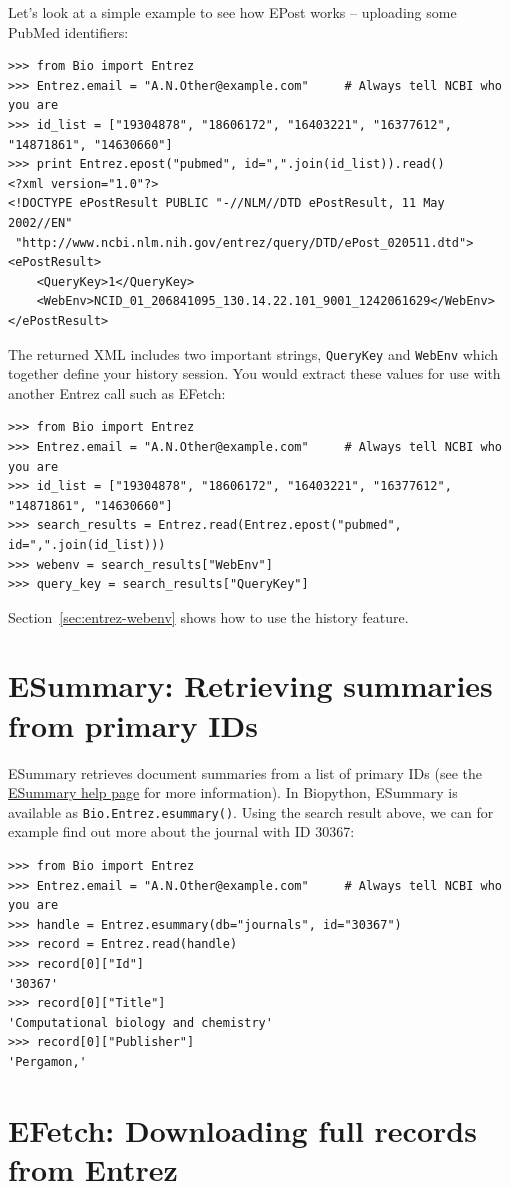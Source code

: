 \documentclass{report}
\begin{document}
Let's look at a simple example to see how EPost works -- uploading some PubMed identifiers:
\begin{verbatim}
>>> from Bio import Entrez
>>> Entrez.email = "A.N.Other@example.com"     # Always tell NCBI who you are
>>> id_list = ["19304878", "18606172", "16403221", "16377612", "14871861", "14630660"]
>>> print Entrez.epost("pubmed", id=",".join(id_list)).read()
<?xml version="1.0"?>
<!DOCTYPE ePostResult PUBLIC "-//NLM//DTD ePostResult, 11 May 2002//EN"
 "http://www.ncbi.nlm.nih.gov/entrez/query/DTD/ePost_020511.dtd">
<ePostResult>
	<QueryKey>1</QueryKey>
	<WebEnv>NCID_01_206841095_130.14.22.101_9001_1242061629</WebEnv>
</ePostResult>
\end{verbatim}
\noindent The returned XML includes two important strings, \verb|QueryKey| and \verb|WebEnv| which together define your history session.
You would extract these values for use with another Entrez call such as EFetch:
\begin{verbatim}
>>> from Bio import Entrez
>>> Entrez.email = "A.N.Other@example.com"     # Always tell NCBI who you are
>>> id_list = ["19304878", "18606172", "16403221", "16377612", "14871861", "14630660"]
>>> search_results = Entrez.read(Entrez.epost("pubmed", id=",".join(id_list)))
>>> webenv = search_results["WebEnv"]
>>> query_key = search_results["QueryKey"] 
\end{verbatim}
\noindent Section~\ref{sec:entrez-webenv} shows how to use the history feature.

\section{ESummary: Retrieving summaries from primary IDs}
ESummary retrieves document summaries from a list of primary IDs (see the  \href{http://www.ncbi.nlm.nih.gov/entrez/query/static/esummary\_help.html}{ESummary help page} for more information). In Biopython, ESummary is available as \verb+Bio.Entrez.esummary()+. Using the search result above, we can for example find out more about the journal with ID 30367:
\begin{verbatim}
>>> from Bio import Entrez
>>> Entrez.email = "A.N.Other@example.com"     # Always tell NCBI who you are
>>> handle = Entrez.esummary(db="journals", id="30367")
>>> record = Entrez.read(handle)
>>> record[0]["Id"]
'30367'
>>> record[0]["Title"]
'Computational biology and chemistry'
>>> record[0]["Publisher"]
'Pergamon,'
\end{verbatim}

\section{EFetch: Downloading full records from Entrez}
\label{sec:efetch}
\end{document}

